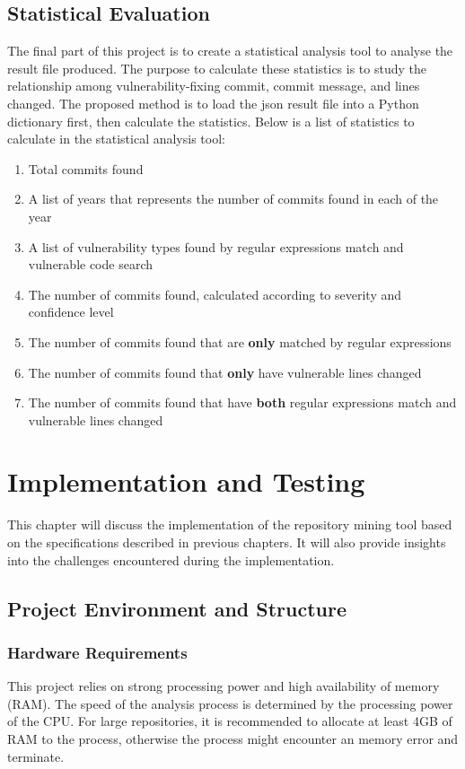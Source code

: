\documentclass[12pt, a4paper]{report}
\begin{document}
\section{Statistical Evaluation}
The final part of this project is to create a statistical analysis tool to analyse the result file
produced. The purpose to calculate these statistics is to study the relationship among
vulnerability-fixing commit, commit message, and lines changed. The proposed method is to load the
\acrshort{json} result file into a Python dictionary first, then calculate the statistics. Below is
a list of statistics to calculate in the statistical analysis tool:
\begin{enumerate}
  \item Total commits found
  \item A list of years that represents the number of commits found in each of the year
  \item A list of vulnerability types found by regular expressions match and vulnerable code search
  \item The number of commits found, calculated according to severity and confidence level
  \item The number of commits found that are \textbf{only} matched by regular expressions
  \item The number of commits found that \textbf{only} have vulnerable lines changed
  \item The number of commits found that have \textbf{both} regular expressions match and vulnerable
  lines changed
\end{enumerate}

\chapter{Implementation and Testing} \label{chap:implementation}
This chapter will discuss the implementation of the repository mining tool based on the
specifications described in previous chapters. It will also provide insights into the challenges
encountered during the implementation.

\section{Project Environment and Structure}
\subsection{Hardware Requirements}
This project relies on strong processing power and high availability of memory (RAM). The speed of
the analysis process is determined by the processing power of the CPU. For large repositories, it is
recommended to allocate at least 4GB of RAM to the process, otherwise the process might encounter an
memory error and terminate.
\end{document}
